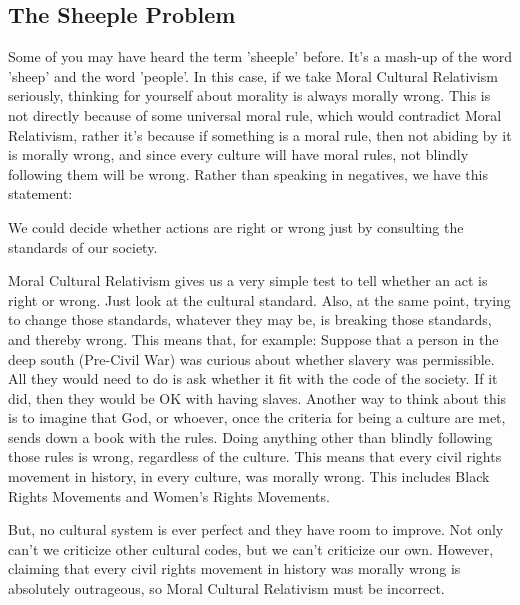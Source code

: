 \subsection{The Sheeple Problem}

Some of you may have heard the term 'sheeple' before. It's a mash-up of the word 'sheep' and the word 'people'. In this case, if we take Moral Cultural Relativism seriously, thinking for yourself about morality is always morally wrong. This is not directly because of some universal moral rule, which would contradict Moral Relativism, rather it's because if something is a moral rule, then not abiding by it is morally wrong, and since every culture will have moral rules, not blindly following them will be wrong. Rather than speaking in negatives, we have this statement: 
\begin{center}
We could decide whether actions are right or wrong just by consulting the standards of our society.
\end{center}
Moral Cultural Relativism gives us a very simple test to tell whether an act is right or wrong. Just look at the cultural standard. Also, at the same point, trying to change those standards, whatever they may be, is breaking those standards, and thereby wrong. This means that, for example: Suppose that a person in the deep south (Pre-Civil War) was curious about whether slavery was permissible. All they would need to do is ask whether it fit with the code of the society. If it did, then they would be OK with having slaves. Another way to think about this is to imagine that God, or whoever, once the criteria for being a culture are met, sends down a book with the rules. Doing anything other than blindly following those rules is wrong, regardless of the culture. This means that every civil rights movement in history, in every culture, was morally wrong. This includes Black Rights Movements and Women's Rights Movements.

But, no cultural system is ever perfect and they have room to improve. Not only can’t we criticize other cultural codes, but we can’t criticize our own. However, claiming that every civil rights movement in history was morally wrong is absolutely outrageous, so Moral Cultural Relativism must be incorrect.  

